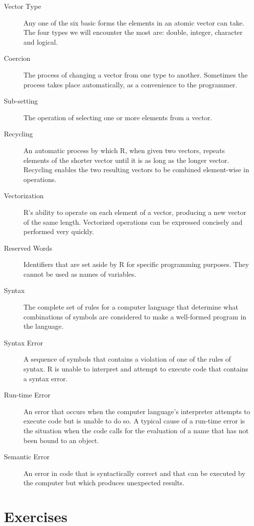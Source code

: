 \documentclass[]{book}
\theoremstyle{definition}
\theoremstyle{definition}
\theoremstyle{remark}
\begin{document}
{\begin{description}
\item[Vector Type]
Any one of the six basic forms the elements in an atomic vector can
take. The four types we will encounter the most are: double, integer,
character and logical.
\item[Coercion]
The process of changing a vector from one type to another. Sometimes the
process takes place automatically, as a convenience to the programmer.
\item[Sub-setting]
The operation of selecting one or more elements from a vector.
\item[Recycling]
An automatic process by which R, when given two vectors, repeats
elements of the shorter vector until it is as long as the longer vector.
Recycling enables the two resulting vectors to be combined element-wise
in operations.
\item[Vectorization]
R's ability to operate on each element of a vector, producing a new
vector of the same length. Vectorized operations can be expressed
concisely and performed very quickly.
\item[Reserved Words]
Identifiers that are set aside by R for specific programming purposes.
They cannot be used as names of variables.
\item[Syntax]
The complete set of rules for a computer language that determine what
combinations of symbols are considered to make a well-formed program in
the language.
\item[Syntax Error]
A sequence of symbols that contains a violation of one of the rules of
syntax. R is unable to interpret and attempt to execute code that
contains a syntax error.
\item[Run-time Error]
An error that occurs when the computer language's interpreter attempts
to execute code but is unable to do so. A typical cause of a run-time
error is the situation when the code calls for the evaluation of a name
that has not been bound to an object.
\item[Semantic Error]
An error in code that is syntactically correct and that can be executed
by the computer but which produces unexpected results.
\end{description}

\newpage

\section*{Exercises}\label{exercises}

}
\end{document}
